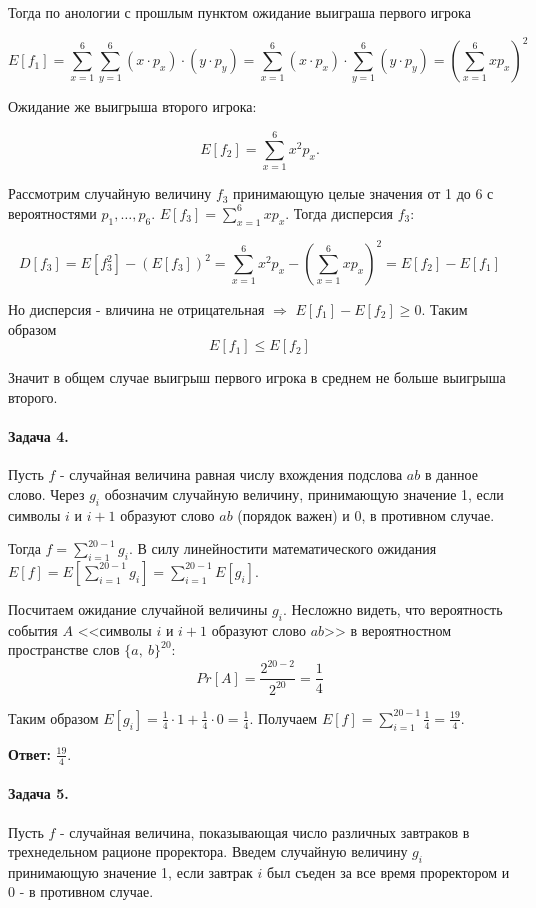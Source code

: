 \documentclass{article}
\begin{document}
    Тогда по анологии с прошлым пунктом ожидание выиграша первого игрока 

    $$E[f_1] = \sum_{x=1}^{6}\sum_{y=1}^{6} (x \cdot p_x) \cdot (y \cdot p_y) = 
    \sum_{x=1}^{6} (x \cdot p_x) \cdot \sum_{y=1}^{6} (y \cdot p_y) = (\sum_{x=1}^{6} xp_x)^2$$

    Ожидание же выигрыша второго игрока:

    $$E[f_2] = \sum_{x=1}^{6} x^2p_x.$$

    Рассмотрим случайную величину $f_3$ принимающую целые значения от 1 до 6 с вероятностями $p_1, \ldots, p_6$. $E[f_3] = \sum_{x=1}^{6} xp_x$. Тогда дисперсия $f_3$: 

    $$D[f_3] = E[f_3^2] - (E[f_3])^2 = \sum_{x=1}^{6} x^2p_x - (\sum_{x=1}^{6} xp_x)^2 = E[f_2] - E[f_1]$$

    Но дисперсия - вличина не отрицательная $\Rightarrow$ $E[f_1] - E[f_2] \ge 0$. Таким образом 
     $$E[f_1] \le E[f_2]$$

    Значит в общем случае выигрыш первого игрока в среднем не больше выигрыша второго.


    \paragraph{Задача 4.}
    Пусть $f$ - случайная величина равная числу вхождения подслова $ab$ в данное слово. Через $g_i$ обозначим случайную величину, принимающую значение 1, если символы $i$ и $i + 1$ образуют слово $ab$ (порядок важен) и 0, в противном случае.

    Тогда $f = \sum_{i=1}^{20 - 1} g_i$. В силу линейностити математического ожидания $E[f] = E[\sum_{i=1}^{20 - 1} g_i] = \sum_{i=1}^{20 - 1} E[g_i]$. 

    Посчитаем ожидание случайной величины $g_i$. Несложно видеть, что вероятность события $A$ <<символы $i$ и $i + 1$ образуют слово $ab$>> в вероятностном пространстве слов $\{a,\ b\}^{20}$:
    $$Pr[A] = \frac{2^{20 - 2}}{2^{20}} = \frac{1}{4}$$

    Таким образом $E[g_i] = \frac{1}{4} \cdot 1 + \frac{1}{4} \cdot 0 = \frac{1}{4}$.
    Получаем $E[f] = \sum_{i=1}^{20 - 1} \frac{1}{4} = \frac{19}{4}$.

    \textbf{Ответ:} $\frac{19}{4}$.

    \paragraph{Задача 5.}
    Пусть $f$ - случайная величина, показывающая число различных завтраков в трехнедельном рационе проректора. Введем случайную величину $g_i$ принимающую значение 1, если завтрак $i$ был съеден за все время проректором и 0 - в противном случае.
\end{document}
